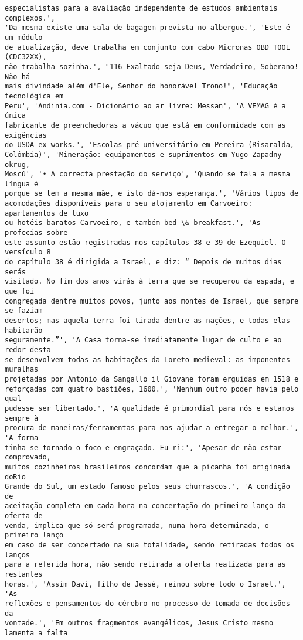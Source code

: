 \documentclass[10pt]{article}
\begin{document}
\begin{Verbatim}[commandchars=\\\{\}]
especialistas para a avaliação independente de estudos ambientais complexos.',
'Da mesma existe uma sala de bagagem prevista no albergue.', 'Este é um módulo
de atualização, deve trabalha em conjunto com cabo Micronas OBD TOOL (CDC32XX),
não trabalha sozinha.', "116 Exaltado seja Deus, Verdadeiro, Soberano! Não há
mais divindade além d'Ele, Senhor do honorável Trono!", 'Educação tecnológica em
Peru', 'Andinia.com - Dicionário ao ar livre: Messan', 'A VEMAG é a única
fabricante de preenchedoras a vácuo que está em conformidade com as exigências
do USDA ex works.', 'Escolas pré-universitário em Pereira (Risaralda,
Colômbia)', 'Mineração: equipamentos e suprimentos em Yugo-Zapadny okrug,
Moscú', '• A correcta prestação do serviço', 'Quando se fala a mesma língua é
porque se tem a mesma mãe, e isto dá-nos esperança.', 'Vários tipos de
acomodações disponíveis para o seu alojamento em Carvoeiro: apartamentos de luxo
ou hotéis baratos Carvoeiro, e também bed \& breakfast.', 'As profecias sobre
este assunto estão registradas nos capítulos 38 e 39 de Ezequiel. O versículo 8
do capítulo 38 é dirigida a Israel, e diz: “ Depois de muitos dias serás
visitado. No fim dos anos virás à terra que se recuperou da espada, e que foi
congregada dentre muitos povos, junto aos montes de Israel, que sempre se faziam
desertos; mas aquela terra foi tirada dentre as nações, e todas elas habitarão
seguramente.”', 'A Casa torna-se imediatamente lugar de culto e ao redor desta
se desenvolvem todas as habitações da Loreto medieval: as imponentes muralhas
projetadas por Antonio da Sangallo il Giovane foram erguidas em 1518 e
reforçadas com quatro bastiões, 1600.', 'Nenhum outro poder havia pelo qual
pudesse ser libertado.', 'A qualidade é primordial para nós e estamos sempre à
procura de maneiras/ferramentas para nos ajudar a entregar o melhor.', 'A forma
tinha-se tornado o foco e engraçado. Eu ri:', 'Apesar de não estar comprovado,
muitos cozinheiros brasileiros concordam que a picanha foi originada doRio
Grande do Sul, um estado famoso pelos seus churrascos.', 'A condição de
aceitação completa em cada hora na concertação do primeiro lanço da oferta de
venda, implica que só será programada, numa hora determinada, o primeiro lanço
em caso de ser concertado na sua totalidade, sendo retiradas todos os lanços
para a referida hora, não sendo retirada a oferta realizada para as restantes
horas.', 'Assim Davi, filho de Jessé, reinou sobre todo o Israel.', 'As
reflexões e pensamentos do cérebro no processo de tomada de decisões da
vontade.', 'Em outros fragmentos evangélicos, Jesus Cristo mesmo lamenta a falta

\end{Verbatim}
\end{document}
